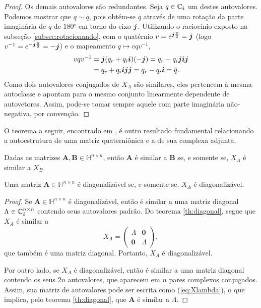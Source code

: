 \begin{proof}
Os demais autovalores s\~ao redundantes. Seja $ q \in \mathbb{C}_{\boldsymbol{i}}$ um destes autovalores. Podemos mostrar que $ q \sim \overline{q} $, pois obt\'em-se $ \overline{q} $ atrav\'es de uma rota\c c\~ao da parte imagin\'aria de $ q $ de 180$ ^\circ $ em torno do eixo $ \boldsymbol{j} $. Utilizando o racioc\'inio exposto na subse\c c\~ao \ref{subsec:rotacionando}, com o quat\'ernio $ v = e^{\boldsymbol{j} \frac{\pi}{2}} = \boldsymbol{j} $ (logo $ v^{-1} = e^{- \boldsymbol{j} \frac{\pi}{2}} = -\boldsymbol{j} $) e o mapeamento $ q \mapsto v q v^{-1} $,
\begin{equation}
\begin{aligned}
v q v^{-1} &= \boldsymbol{j} (q_r + q_i \boldsymbol{i}) (-\boldsymbol{j}) = q_r - q_i \boldsymbol{j} \boldsymbol{i} \boldsymbol{j}\\
&= q_r + q_i \boldsymbol{i} \boldsymbol{j} \boldsymbol{j} = q_r - q_i \boldsymbol{i} = \overline{q}.
\end{aligned}
\end{equation}
Como dois autovalores conjugados de $ X_A $ s\~ao similares, eles pertencem \`a mesma autoclasse e apontam para o mesmo conjunto linearmente dependente de autovetores. Assim, pode-se tomar sempre aquele com parte imagin\'aria n\~ao-negativa, por conven\c c\~ao.
\end{proof}

O teorema a seguir, encontrado em \cite[Teorema 7.4]{zhang1997quaternions}, \'e outro resultado fundamental relacionando a autoestrutura de uma matriz quaterni\^onica e a de sua complexa adjunta.

\begin{theorem}
\label{th:diagonal}
Dadas as matrizes $ \mathbf{A}, \mathbf{B} \in \mathbb{H}^{n \times n} $, ent\~ao $ \mathbf{A} $ \'e similar a $ \mathbf{B} $ se, e somente se, $ X_A $ \'e similar a $ X_B $.
\end{theorem}

\begin{corollary}
Uma matriz $  \mathbf{A} \in \mathbb{H}^{n \times n} $ \'e diagonaliz\'avel se, e somente se, $ X_A $ \'e diagonaliz\'avel.
\end{corollary}
\begin{proof}
Se $ \mathbf{A} \in \mathbb{H}^{n \times n} $ \'e diagonaliz\'avel, ent\~ao \'e similar a uma matriz diagonal $ \Lambda \in \mathbb{C}^{n \times n}_{\boldsymbol{i}} $ contendo seus autovalores padr\~ao. Do teorema \ref{th:diagonal}, segue que $ X_A $ \'e similar a
\begin{equation}
\label{eq:Xlambda}
X_{\Lambda} =
\begin{pmatrix}
\Lambda & \mathbf{0}\\ 
\mathbf{0} & \overline{\Lambda}
\end{pmatrix},
\end{equation}
que tamb\'em \'e uma matriz diagonal. Portanto, $ X_A $ \'e diagonaliz\'avel.

Por outro lado, se $ X_A $ \'e diagonaliz\'avel, ent\~ao \'e similar a uma matriz diagonal contendo os seus $ 2n $ autovalores, que aparecem em $ n $ pares complexos conjugados. Assim, sua matriz de autovalores pode ser escrita como (\ref{eq:Xlambda}), o que implica, pelo teorema \ref{th:diagonal}, que $ \mathbf{A} $ \'e similar a $ \Lambda $.
\end{proof}

